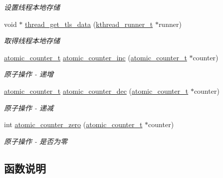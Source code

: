 \begin{DoxyCompactItemize}
\begin{DoxyCompactList}\small\item\em 设置线程本地存储 \end{DoxyCompactList}\item 
void $\ast$ \hyperlink{a00109_gaf5bb2dd001c42fdbdcdcb2048f76ae89_gaf5bb2dd001c42fdbdcdcb2048f76ae89}{thread\+\_\+get\+\_\+tls\+\_\+data} (\hyperlink{a00051_a4f78c259c9527c821f1a6f87495dd339_a4f78c259c9527c821f1a6f87495dd339}{kthread\+\_\+runner\+\_\+t} $\ast$runner)
\begin{DoxyCompactList}\small\item\em 取得线程本地存储 \end{DoxyCompactList}\item 
\hyperlink{a00051_a0d043bbb6b8db19fea54ab9271d352b6_a0d043bbb6b8db19fea54ab9271d352b6}{atomic\+\_\+counter\+\_\+t} \hyperlink{a00109_gade4f41f1cd519f2719b5114ce7801232_gade4f41f1cd519f2719b5114ce7801232}{atomic\+\_\+counter\+\_\+inc} (\hyperlink{a00051_a0d043bbb6b8db19fea54ab9271d352b6_a0d043bbb6b8db19fea54ab9271d352b6}{atomic\+\_\+counter\+\_\+t} $\ast$counter)
\begin{DoxyCompactList}\small\item\em 原子操作 -\/ 递增 \end{DoxyCompactList}\item 
\hyperlink{a00051_a0d043bbb6b8db19fea54ab9271d352b6_a0d043bbb6b8db19fea54ab9271d352b6}{atomic\+\_\+counter\+\_\+t} \hyperlink{a00109_gafc2df03d75cf9168b72e8c5e11953437_gafc2df03d75cf9168b72e8c5e11953437}{atomic\+\_\+counter\+\_\+dec} (\hyperlink{a00051_a0d043bbb6b8db19fea54ab9271d352b6_a0d043bbb6b8db19fea54ab9271d352b6}{atomic\+\_\+counter\+\_\+t} $\ast$counter)
\begin{DoxyCompactList}\small\item\em 原子操作 -\/ 递减 \end{DoxyCompactList}\item 
int \hyperlink{a00109_ga141897cac9743394a99ff7780daa6a80_ga141897cac9743394a99ff7780daa6a80}{atomic\+\_\+counter\+\_\+zero} (\hyperlink{a00051_a0d043bbb6b8db19fea54ab9271d352b6_a0d043bbb6b8db19fea54ab9271d352b6}{atomic\+\_\+counter\+\_\+t} $\ast$counter)
\begin{DoxyCompactList}\small\item\em 原子操作 -\/ 是否为零 \end{DoxyCompactList}\end{DoxyCompactItemize}


\subsection{函数说明}
\hypertarget{a00109_gafc2df03d75cf9168b72e8c5e11953437_gafc2df03d75cf9168b72e8c5e11953437}{}
